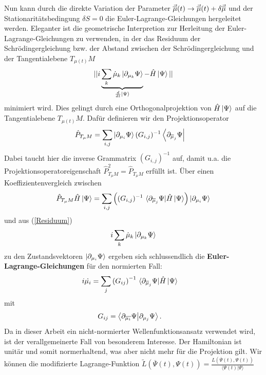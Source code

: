 Nun kann durch die direkte Variation der Parameter $\vec{\overline{\mu}}(t)\rightarrow \vec{\overline{\mu}}(t) + \delta\vec{\overline{\mu}}$ und der Stationaritätsbedingung 
$\delta S = 0$ die Euler-Lagrange-Gleichungen hergeleitet werden. Eleganter ist die geometrische Interpretion zur Herleitung der Euler-Lagrange-Gleichungen
zu verwenden, in der das Residuum der Schrödingergleichung bzw. der Abstand zwischen der Schrödingergleichung und der Tangentialebene $T_{\mu(t)}M$ 
\begin{align}\label{Residuum}
    || i\underbrace{\sum_k \dot{\mu}_k\ket{\partial_{\mu_k}\Psi}}_{\frac{d}{dt}\ket{\Psi}} - \hat{H}\ket{\Psi} || 
\end{align}
minimiert wird. Dies gelingt durch eine Orthogonalprojektion von $\hat{H}\ket{\Psi}$ auf die Tangentialebene $T_{\mu(t)}M$. Dafür definieren wir den 
Projektionsoperator
\begin{align}
    \hat{P}_{T_{\mu}M} &= \sum_{i,j}\ket{\partial_{\mu_i}\Psi}(G_{i,j})^{-1}\bra{\partial_{\overline{\mu}_j}\Psi}
\end{align}
Dabei taucht hier die inverse Grammatrix $(G_{i,j})^{-1}$ auf, damit u.a. die Projektionsoperatoreigenschaft $\hat{P}_{T_{\mu}M}^2=\hat{P}_{T_{\mu}M}$ 
erfüllt ist. Über einen Koeffizientenvergleich zwischen
\begin{align}
    \hat{P}_{T_{\mu}M}\hat{H}\ket{\Psi} = \sum_{i,j}\left((G_{i,j})^{-1}\ 
    \langle\partial_{\muk_j}\Psi|\hat{H}\ket{\Psi}\right)\ket{\partial_{\mu_i}\Psi}
\end{align} 
und aus (\ref{Residuum})
\begin{align}
    i\sum_k \dot{\mu}_k\ket{\partial_{\mu_k}\Psi}
\end{align}
zu den Zustandsvektoren $\ket{\partial_{\mu_i}\Psi}$ ergeben sich schlussendlich die \textbf{Euler-Lagrange-Gleichungen} für den normierten Fall:
\begin{align}
    i\dot{\mu_i} &= \sum_{j}\left(G_{ij}\right)^{-1}\thinspace \langle\partial_{\overline{\mu}_j}\Psi|\hat{H}\ket{\Psi}
\end{align}
mit
\begin{align}
    G_{ij} &= \bra{\partial_{\overline{\mu_i}}\Psi}\ket{\partial_{\mu_j}\Psi}. 
\end{align}
Da in dieser Arbeit ein nicht-normierter Wellenfunktionsansatz verwendet wird, ist der verallgemeinerte Fall von besonderem Interesse. Der Hamiltonian ist unitär und somit normerhaltend, was aber nicht mehr für die Projektion gilt. Wir
können die modifizierte Lagrange-Funktion $\widetilde{L}(\overline{\Psi}(t), \Psi(t)) = \frac{L(\overline{\Psi}(t), \Psi(t))}{\langle \Psi(t)|\Psi\rangle}$
